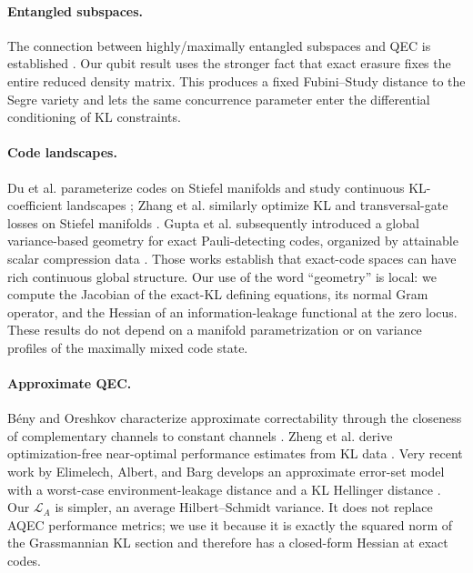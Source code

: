 \documentclass[11pt]{article}
\theoremstyle{definition}
\newcommand{\cL}{\mathcal L}
\newcommand{\1}{\mathbf 1}
\begin{document}
\paragraph{Entangled subspaces.}
The connection between highly/maximally entangled subspaces and QEC is established \cite{GourWallach2007}.  Our qubit result uses the stronger fact that exact erasure fixes the entire reduced density matrix.  This produces a fixed Fubini--Study distance to the Segre variety and lets the same concurrence parameter enter the differential conditioning of KL constraints.

\paragraph{Code landscapes.}
Du et al. parameterize codes on Stiefel manifolds and study continuous KL-coefficient landscapes \cite{DuZhangPoonZeng2024}; Zhang et al. similarly optimize KL and transversal-gate losses on Stiefel manifolds \cite{ZhangWuHuangZeng2025}.  Gupta et al. subsequently introduced a global variance-based geometry for exact Pauli-detecting codes, organized by attainable scalar compression data \cite{GuptaSunHeZeng2026}.  Those works establish that exact-code spaces can have rich continuous global structure.  Our use of the word ``geometry'' is local: we compute the Jacobian of the exact-KL defining equations, its normal Gram operator, and the Hessian of an information-leakage functional at the zero locus.  These results do not depend on a manifold parametrization or on variance profiles of the maximally mixed code state.

\paragraph{Approximate QEC.}
B\'eny and Oreshkov characterize approximate correctability through the closeness of complementary channels to constant channels \cite{BenyOreshkov2009}.  Zheng et al. derive optimization-free near-optimal performance estimates from KL data \cite{ZhengHeLeeJiang2024}.  Very recent work by Elimelech, Albert, and Barg develops an approximate error-set model with a worst-case environment-leakage distance and a KL Hellinger distance \cite{ElimelechAlbertBarg2026}.  Our $\cL_A$ is simpler, an average Hilbert--Schmidt variance.  It does not replace AQEC performance metrics; we use it because it is exactly the squared norm of the Grassmannian KL section and therefore has a closed-form Hessian at exact codes.
\end{document}
